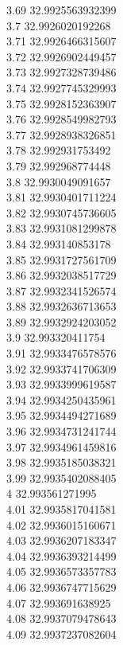 {3.69	32.9925563932399\\
3.7	32.9926020192268\\
3.71	32.9926466315607\\
3.72	32.9926902449457\\
3.73	32.9927328739486\\
3.74	32.9927745329993\\
3.75	32.9928152363907\\
3.76	32.9928549982793\\
3.77	32.9928938326851\\
3.78	32.992931753492\\
3.79	32.992968774448\\
3.8	32.9930049091657\\
3.81	32.9930401711224\\
3.82	32.9930745736605\\
3.83	32.9931081299878\\
3.84	32.993140853178\\
3.85	32.9931727561709\\
3.86	32.9932038517729\\
3.87	32.9932341526574\\
3.88	32.9932636713653\\
3.89	32.9932924203052\\
3.9	32.993320411754\\
3.91	32.9933476578576\\
3.92	32.9933741706309\\
3.93	32.9933999619587\\
3.94	32.9934250435961\\
3.95	32.9934494271689\\
3.96	32.9934731241744\\
3.97	32.9934961459816\\
3.98	32.9935185038321\\
3.99	32.9935402088405\\
4	32.993561271995\\
4.01	32.9935817041581\\
4.02	32.9936015160671\\
4.03	32.9936207183347\\
4.04	32.9936393214499\\
4.05	32.9936573357783\\
4.06	32.9936747715629\\
4.07	32.993691638925\\
4.08	32.9937079478643\\
4.09	32.9937237082604\\
}
